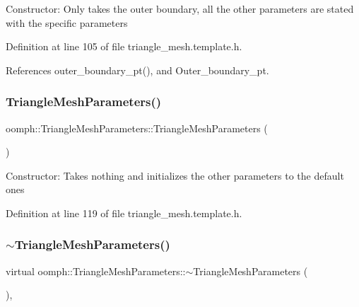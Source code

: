 Constructor\+: Only takes the outer boundary, all the other parameters are stated with the specific parameters 

Definition at line 105 of file triangle\+\_\+mesh.\+template.\+h.



References outer\+\_\+boundary\+\_\+pt(), and Outer\+\_\+boundary\+\_\+pt.

\mbox{\label{classoomph_1_1TriangleMeshParameters_a942be2020ecd26582855d1920ce23803}} 
\subsubsection{\texorpdfstring{Triangle\+Mesh\+Parameters()}{TriangleMeshParameters()}\hspace{0.1cm}{\footnotesize\ttfamily [3/3]}}
{\footnotesize\ttfamily oomph\+::\+Triangle\+Mesh\+Parameters\+::\+Triangle\+Mesh\+Parameters (\begin{DoxyParamCaption}{ }\end{DoxyParamCaption})\hspace{0.3cm}{\ttfamily [inline]}}

Constructor\+: Takes nothing and initializes the other parameters to the default ones 

Definition at line 119 of file triangle\+\_\+mesh.\+template.\+h.

\mbox{\label{classoomph_1_1TriangleMeshParameters_a2f475a9f1c9d9d89122cfaf706dfff90}} 
\subsubsection{\texorpdfstring{$\sim$\+Triangle\+Mesh\+Parameters()}{~TriangleMeshParameters()}}
{\footnotesize\ttfamily virtual oomph\+::\+Triangle\+Mesh\+Parameters\+::$\sim$\+Triangle\+Mesh\+Parameters (\begin{DoxyParamCaption}{ }\end{DoxyParamCaption})\hspace{0.3cm}{\ttfamily [inline]}, {\ttfamily [virtual]}}




